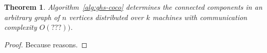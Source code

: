 \documentclass[11pt,epsf]{article}
\newtheorem{theorem}{Theorem}
\begin{document}
{{{\begin{algorithm}
\begin{algorithmic}
          \ENDFOR
          \ENDFOR
        \end{algorithmic}
      \end{algorithm}
    }

    \begin{theorem}
      \label{thm:ghs-coco}
      Algorithm~\ref{alg:ghs-coco} determines the connected components in an arbitrary graph
      of $n$ vertices distributed over $k$ machines with communication complexity $O(???))$.
    \end{theorem}
    \begin{proof}
      Because reasons.
    \end{proof}
  }
}
\end{document}
